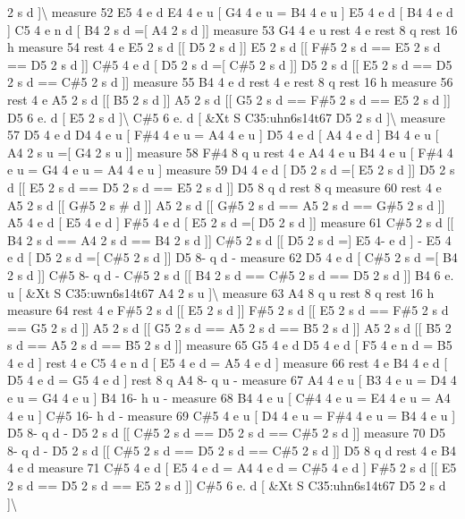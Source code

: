 2 s d \mbox{]}\textbackslash{} measure 52 E5 4 e d E4 4 e u \mbox{[} G4 4 e u = B4 4 e u \mbox{]} E5 4 e d \mbox{[} B4 4 e d \mbox{]} C5 4 e n d \mbox{[} B4 2 s d =\mbox{[} A4 2 s d \mbox{]}\mbox{]} measure 53 G4 4 e u rest 4 e rest 8 q rest 16 h measure 54 rest 4 e E5 2 s d \mbox{[}\mbox{[} D5 2 s d \mbox{]}\mbox{]} E5 2 s d \mbox{[}\mbox{[} F\#5 2 s d == E5 2 s d == D5 2 s d \mbox{]}\mbox{]} C\#5 4 e d \mbox{[} D5 2 s d =\mbox{[} C\#5 2 s d \mbox{]}\mbox{]} D5 2 s d \mbox{[}\mbox{[} E5 2 s d == D5 2 s d == C\#5 2 s d \mbox{]}\mbox{]} measure 55 B4 4 e d rest 4 e rest 8 q rest 16 h measure 56 rest 4 e A5 2 s d \mbox{[}\mbox{[} B5 2 s d \mbox{]}\mbox{]} A5 2 s d \mbox{[}\mbox{[} G5 2 s d == F\#5 2 s d == E5 2 s d \mbox{]}\mbox{]} D5 6 e. d \mbox{[} E5 2 s d \mbox{]}\textbackslash{} C\#5 6 e. d \mbox{[} \&Xt S C35\+:uhn6s14t67 D5 2 s d \mbox{]}\textbackslash{} measure 57 D5 4 e d D4 4 e u \mbox{[} F\#4 4 e u = A4 4 e u \mbox{]} D5 4 e d \mbox{[} A4 4 e d \mbox{]} B4 4 e u \mbox{[} A4 2 s u =\mbox{[} G4 2 s u \mbox{]}\mbox{]} measure 58 F\#4 8 q u rest 4 e A4 4 e u B4 4 e u \mbox{[} F\#4 4 e u = G4 4 e u = A4 4 e u \mbox{]} measure 59 D4 4 e d \mbox{[} D5 2 s d =\mbox{[} E5 2 s d \mbox{]}\mbox{]} D5 2 s d \mbox{[}\mbox{[} E5 2 s d == D5 2 s d == E5 2 s d \mbox{]}\mbox{]} D5 8 q d rest 8 q measure 60 rest 4 e A5 2 s d \mbox{[}\mbox{[} G\#5 2 s \# d \mbox{]}\mbox{]} A5 2 s d \mbox{[}\mbox{[} G\#5 2 s d == A5 2 s d == G\#5 2 s d \mbox{]}\mbox{]} A5 4 e d \mbox{[} E5 4 e d \mbox{]} F\#5 4 e d \mbox{[} E5 2 s d =\mbox{[} D5 2 s d \mbox{]}\mbox{]} measure 61 C\#5 2 s d \mbox{[}\mbox{[} B4 2 s d == A4 2 s d == B4 2 s d \mbox{]}\mbox{]} C\#5 2 s d \mbox{[}\mbox{[} D5 2 s d =\mbox{]} E5 4-\/ e d \mbox{]} -\/ E5 4 e d \mbox{[} D5 2 s d =\mbox{[} C\#5 2 s d \mbox{]}\mbox{]} D5 8-\/ q d -\/ measure 62 D5 4 e d \mbox{[} C\#5 2 s d =\mbox{[} B4 2 s d \mbox{]}\mbox{]} C\#5 8-\/ q d -\/ C\#5 2 s d \mbox{[}\mbox{[} B4 2 s d == C\#5 2 s d == D5 2 s d \mbox{]}\mbox{]} B4 6 e. u \mbox{[} \&Xt S C35\+:uwn6s14t67 A4 2 s u \mbox{]}\textbackslash{} measure 63 A4 8 q u rest 8 q rest 16 h measure 64 rest 4 e F\#5 2 s d \mbox{[}\mbox{[} E5 2 s d \mbox{]}\mbox{]} F\#5 2 s d \mbox{[}\mbox{[} E5 2 s d == F\#5 2 s d == G5 2 s d \mbox{]}\mbox{]} A5 2 s d \mbox{[}\mbox{[} G5 2 s d == A5 2 s d == B5 2 s d \mbox{]}\mbox{]} A5 2 s d \mbox{[}\mbox{[} B5 2 s d == A5 2 s d == B5 2 s d \mbox{]}\mbox{]} measure 65 G5 4 e d D5 4 e d \mbox{[} F5 4 e n d = B5 4 e d \mbox{]} rest 4 e C5 4 e n d \mbox{[} E5 4 e d = A5 4 e d \mbox{]} measure 66 rest 4 e B4 4 e d \mbox{[} D5 4 e d = G5 4 e d \mbox{]} rest 8 q A4 8-\/ q u -\/ measure 67 A4 4 e u \mbox{[} B3 4 e u = D4 4 e u = G4 4 e u \mbox{]} B4 16-\/ h u -\/ measure 68 B4 4 e u \mbox{[} C\#4 4 e u = E4 4 e u = A4 4 e u \mbox{]} C\#5 16-\/ h d -\/ measure 69 C\#5 4 e u \mbox{[} D4 4 e u = F\#4 4 e u = B4 4 e u \mbox{]} D5 8-\/ q d -\/ D5 2 s d \mbox{[}\mbox{[} C\#5 2 s d == D5 2 s d == C\#5 2 s d \mbox{]}\mbox{]} measure 70 D5 8-\/ q d -\/ D5 2 s d \mbox{[}\mbox{[} C\#5 2 s d == D5 2 s d == C\#5 2 s d \mbox{]}\mbox{]} D5 8 q d rest 4 e B4 4 e d measure 71 C\#5 4 e d \mbox{[} E5 4 e d = A4 4 e d = C\#5 4 e d \mbox{]} F\#5 2 s d \mbox{[}\mbox{[} E5 2 s d == D5 2 s d == E5 2 s d \mbox{]}\mbox{]} C\#5 6 e. d \mbox{[} \&Xt S C35\+:uhn6s14t67 D5 2 s d \mbox{]}\textbackslash{} 